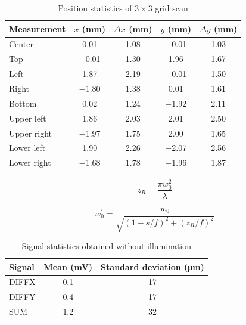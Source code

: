 \begin{table}[htb]
  \centering
  \begin{tabular}{lcccc}
    \toprule
      Measurement &
      $x$ (\si{\milli\meter}) &
      $\Delta x$ (\si{\milli\meter}) &
      $y$ (\si{\milli\meter}) &
      $\Delta y$ (\si{\milli\meter}) \\
    \midrule
      Center & \num{0.01} & \num{+1.08} & \num{-0.01} & \num{+1.03} \\      
      Top & \num{-0.01} & \num{+1.30} & \num{+1.96} & \num{+1.67} \\      
      Left & \num{1.87} & \num{+2.19} & \num{-0.01} & \num{+1.50} \\      
      Right & \num{-1.80} & \num{+1.38} & \num{+0.01} & \num{+1.61} \\
      Bottom & \num{0.02} & \num{+1.24} & \num{-1.92} & \num{+2.11} \\
      Upper left & \num{+1.86} & \num{+2.03} & \num{+2.01} & \num{+2.50} \\
      Upper right & \num{-1.97} & \num{+1.75} & \num{+2.00} & \num{+1.65} \\
      Lower left & \num{+1.90} & \num{+2.26} & \num{-2.07} & \num{+2.56} \\
      Lower right & \num{-1.68} & \num{+1.78} & \num{-1.96} & \num{+1.87} \\
    \bottomrule
  \end{tabular}
  \captionsetup{width=.8\textwidth}
  \caption{Position statistics of $3\times 3$ grid scan}\label{tab:grid_scan_position_statistics}
\end{table}

\begin{equation}
	z_R=\frac{\pi w_0^2}{\lambda}
	\label{eq:rayleigh_length}
\end{equation}

\begin{equation}
	w^\prime_0=\frac{w_0}{\sqrt{(1-s/f)^2+(z_R/f)^2}}
	\label{eq:beam_waist_thin_lens}
\end{equation}

\begin{table}[htb]
  \centering
  \begin{tabular}{lcc}
    \toprule
      Signal &
      Mean (\si{\milli\volt}) &
      Standard deviation (\si{\micro\meter}) \\
    \midrule
      DIFFX & \num{0.1} & \num{17} \\
      DIFFY & \num{0.4} & \num{17} \\
      SUM & \num{1.2} & \num{32} \\
    \bottomrule
  \end{tabular}
  \captionsetup{width=.8\textwidth}
  \caption{Signal statistics obtained without illumination}\label{tab:grid_scan_signal_statistics}
\end{table}

